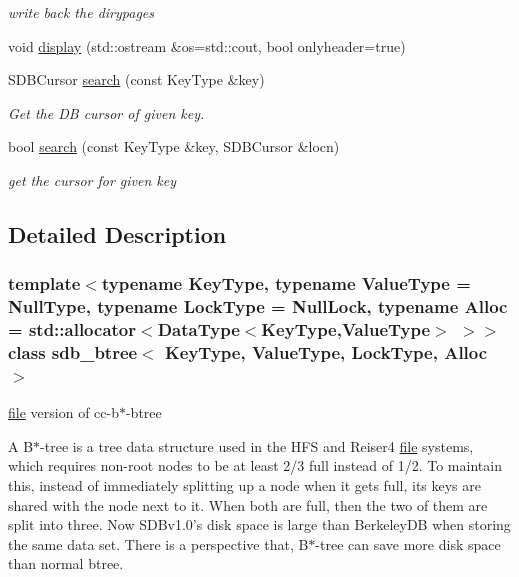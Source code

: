 \begin{CompactItemize}
\begin{CompactList}\small\item\em write back the dirypages \item\end{CompactList}\item 
void \hyperlink{classsdb__btree_b1f5ad2d92b57af57aca4a06c925bb16}{display} (std::ostream \&os=std::cout, bool onlyheader=true)
\item 
\hypertarget{classsdb__btree_cc591b9dee49543d1a39891f4af1b842}{
SDBCursor \hyperlink{classsdb__btree_cc591b9dee49543d1a39891f4af1b842}{search} (const KeyType \&key)}
\label{classsdb__btree_cc591b9dee49543d1a39891f4af1b842}

\begin{CompactList}\small\item\em Get the DB cursor of given key. \item\end{CompactList}\item 
bool \hyperlink{classsdb__btree_2761e4efefbe470ca5121c2eb19f6a6e}{search} (const KeyType \&key, SDBCursor \&locn)
\begin{CompactList}\small\item\em get the cursor for given key \item\end{CompactList}\end{CompactItemize}


\subsection{Detailed Description}
\subsubsection*{template$<$typename KeyType, typename ValueType = NullType, typename LockType = NullLock, typename Alloc = std::allocator$<$DataType$<$KeyType,ValueType$>$ $>$$>$ class sdb\_\-btree$<$ KeyType, ValueType, LockType, Alloc $>$}

\hyperlink{classfile}{file} version of cc-b$\ast$-btree 

A B$\ast$-tree is a tree data structure used in the HFS and Reiser4 \hyperlink{classfile}{file} systems, which requires non-root nodes to be at least 2/3 full instead of 1/2. To maintain this, instead of immediately splitting up a node when it gets full, its keys are shared with the node next to it. When both are full, then the two of them are split into three. Now SDBv1.0’s disk space is large than BerkeleyDB when storing the same data set. There is a perspective that, B$\ast$-tree can save more disk space than normal btree.

